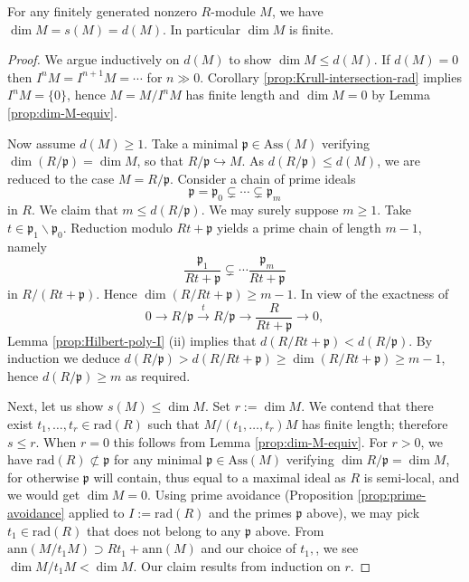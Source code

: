 \begin{theorem}\label{prop:dim-s-d}
	For any finitely generated nonzero $R$-module $M$, we have $\dim M = s(M) = d(M)$. In particular $\dim M$ is finite.
\end{theorem}
\begin{proof}
	We argue inductively on $d(M)$ to show $\dim M \leq d(M)$. If $d(M)=0$ then $I^n M = I^{n+1} M = \cdots$ for $n \gg 0$. Corollary \ref{prop:Krull-intersection-rad} implies $I^n M = \{0\}$, hence $M=M/I^n M$ has finite length and $\dim M = 0$ by Lemma \ref{prop:dim-M-equiv}.
	
	Now assume $d(M) \geq 1$. Take a minimal $\mathfrak{p} \in \text{Ass}(M)$ verifying $\dim(R/\mathfrak{p}) = \dim M$, so that $R/\mathfrak{p} \hookrightarrow M$. As $d(R/\mathfrak{p}) \leq d(M)$, we are reduced to the case $M = R/\mathfrak{p}$. Consider a chain of prime ideals
	\[ \mathfrak{p} = \mathfrak{p}_0 \subsetneq \cdots \subsetneq \mathfrak{p}_m \]
	in $R$. We claim that $m \leq d(R/\mathfrak{p})$. We may surely suppose $m \geq 1$. Take $t \in \mathfrak{p}_1 \smallsetminus \mathfrak{p}_0$. Reduction modulo $Rt + \mathfrak{p}$ yields a prime chain of length $m-1$, namely
	\[ \frac{\mathfrak{p}_1}{Rt + \mathfrak{p}} \subsetneq \cdots \frac{\mathfrak{p}_m}{Rt + \mathfrak{p}} \]
	in $R/(Rt + \mathfrak{p})$. Hence $\dim(R/Rt+\mathfrak{p}) \geq m-1$. In view of the exactness of
	\[ 0 \to R/\mathfrak{p} \xrightarrow{t} R/\mathfrak{p} \to \frac{R}{Rt+\mathfrak{p}} \to 0, \]
	Lemma \ref{prop:Hilbert-poly-I} (ii) implies that $d(R/Rt+\mathfrak{p}) < d(R/\mathfrak{p})$. By induction we deduce $d(R/\mathfrak{p}) > d(R/Rt+\mathfrak{p}) \geq \dim(R/Rt+\mathfrak{p}) \geq m-1$, hence $d(R/\mathfrak{p}) \geq m$ as required.
	
	Next, let us show $s(M) \leq \dim M$. Set $r := \dim M$. We contend that there exist $t_1, \ldots, t_r \in \text{rad}(R)$ such that $M/(t_1, \ldots, t_r)M$ has finite length; therefore $s \leq r$. When $r=0$ this follows from Lemma \ref{prop:dim-M-equiv}. For $r > 0$, we have $\text{rad}(R) \not\subset \mathfrak{p}$ for any minimal $\mathfrak{p} \in \text{Ass}(M)$ verifying $\dim R/\mathfrak{p} = \dim M$, for otherwise $\mathfrak{p}$ will contain, thus equal to a maximal ideal as $R$ is semi-local, and we would get $\dim M = 0$. Using prime avoidance (Proposition \ref{prop:prime-avoidance} applied to $I := \mathrm{rad}(R)$ and the primes $\mathfrak{p}$ above), we may pick $t_1 \in \text{rad}(R)$ that does not belong to any $\mathfrak{p}$ above. From $\text{ann}(M/t_1 M) \supset Rt_1 + \text{ann}(M)$ and our choice of $t_1,$, we see $\dim M/t_1 M < \dim M$. Our claim results from induction on $r$.
	

\end{proof}
